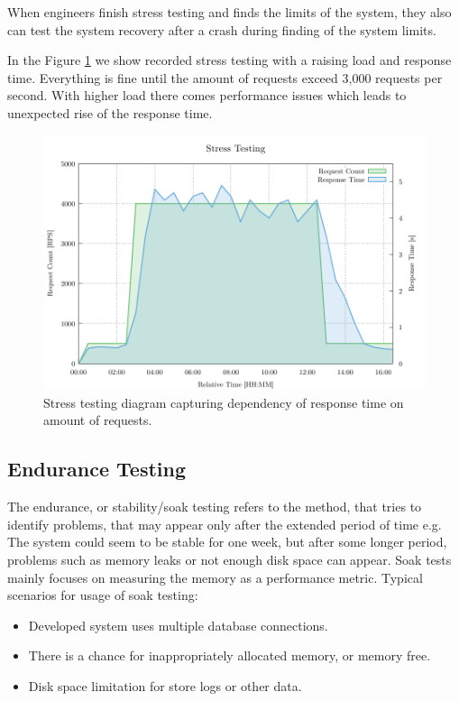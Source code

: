 When engineers finish stress testing and finds the limits of the system, they also can test the system recovery after a crash during finding of the system limits.

In the Figure \ref{fig:stress_test} we show recorded stress testing with a raising load and response time. Everything is fine until the amount of requests exceed 3,000 requests per second. With higher load there comes performance issues which leads to unexpected rise of the response time.

\begin{figure}[H]
  \centering
  \includegraphics[width=15cm]{obrazky-figures/stress_testing.pdf}
  \caption{Stress testing diagram capturing dependency of response time on amount of requests.}
  \label{fig:stress_test}
\end{figure}

\subsection*{Endurance Testing}
\label{Endurance Testing}
The endurance, or stability/soak testing refers to the method, that tries to identify problems, that may appear only after the extended period of time e.g. The system could seem to be stable for one week, but after some longer period, problems such as memory leaks or not enough disk space can appear. Soak tests mainly focuses on measuring the memory as a performance metric. Typical scenarios for usage of soak testing:
\begin{itemize}
	\setlength\itemsep{0em}
	\item Developed system uses multiple database connections.
	\item There is a chance for inappropriately allocated memory, or memory free.
	\item Disk space limitation for store logs or other data.
\end{itemize}

